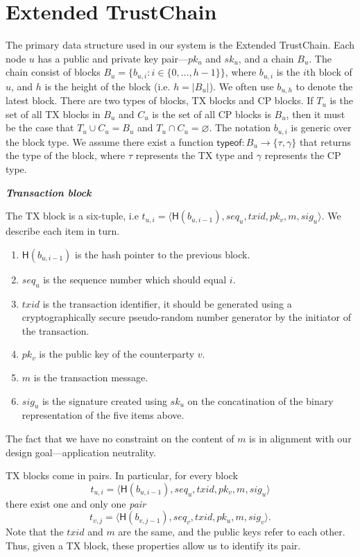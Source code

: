 \section{Extended TrustChain}
The primary data structure used in our system is the Extended TrustChain.
Each node $u$ has a public and private key pair---$pk_u$ and $sk_u$, and a chain $B_u$.
The chain consist of blocks $B_u = \{ b_{u, i} : i \in \{ 0, \dots, h - 1 \} \}$,
where $b_{u, i}$ is the $i$th block of $u$,
and $h$ is the height of the block (i.e. $h = |B_u|$).
We often use $b_{u, h}$ to denote the latest block.
There are two types of blocks, TX blocks and CP blocks.
If $T_u$ is the set of all TX blocks in $B_u$ and $C_u$ is the set of all CP blocks is $B_u$,
then it must be the case that $T_u \cup C_u = B_u$ and $T_u \cap C_u = \varnothing$.
The notation $b_{u, i}$ is generic over the block type.
We assume there exist a function $\textsf{typeof}: B_u \rightarrow \{ \tau, \gamma \}$ that returns the type of the block,
where $\tau$ represents the TX type and $\gamma$ represents the CP type.

\begin{definition}
\textbf{\emph{Transaction block}}

The TX block is a six-tuple, i.e $t_{u, i} = \langle \textsf{H}(b_{u, i - 1}), seq_u, txid, pk_v, m, sig_u \rangle$.
We describe each item in turn.
\begin{enumerate}
\item $\textsf{H}(b_{u, i - 1})$ is the hash pointer to the previous block.
\item $seq_u$ is the sequence number which should equal $i$.
\item $txid$ is the transaction identifier, it should be generated using a cryptographically secure pseudo-random number generator by the initiator of the transaction.
\item $pk_v$ is the public key of the counterparty $v$.
\item $m$ is the transaction message.
\item $sig_u$ is the signature created using $sk_u$ on the concatination of the binary representation of the five items above.
\end{enumerate}
The fact that we have no constraint on the content of $m$ is in alignment with our design goal---application neutrality.

TX blocks come in pairs.
In particular, for every block 
$$t_{u, i} = \langle \textsf{H}(b_{u, i - 1}), seq_u, txid, pk_v, m, sig_u \rangle$$
there exist one and only one \emph{pair} 
$$t_{v, j} = \langle \textsf{H}(b_{v, j - 1}), seq_v, txid, pk_u, m, sig_v \rangle.$$
Note that the $txid$ and $m$ are the same, and the public keys refer to each other.
Thus, given a TX block, these properties allow us to identify its pair.
\end{definition}

